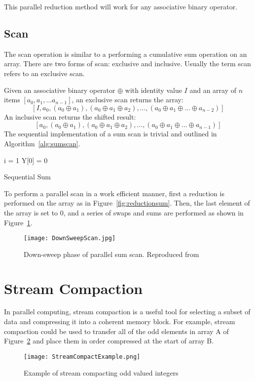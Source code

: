 This parallel reduction method will work for any associative binary operator.

\subsection{Scan}
The scan operation is similar to a performing a cumulative sum operation on an array. There are two forms of scan: exclusive and inclusive. Usually the term scan refers to an exclusive scan.\par
Given an associative binary operator $\oplus$ with identity value $I$ and an array of $n$ items $[a_0, a_1, \ldots a_{n-1}]$, an exclusive scan returns the array: $$[I, a_0, (a_0 \oplus a_1), (a_0 \oplus a_1 \oplus a_2),\ldots, (a_0 \oplus a_1 \oplus \ldots \oplus a_{n-2})]$$ An inclusive scan returns the shifted result:  $$[a_0, (a_0 \oplus a_1), (a_0 \oplus a_1 \oplus a_2),\ldots, (a_0 \oplus a_1 \oplus \ldots \oplus a_{n-1})]$$ The sequential implementation of a sum scan is trivial and outlined in Algorithm~\ref{alg:sumscan}.

\begin{algorithm}[!htpb]
\label{alg:sumscan}
 \singlespacing
 i = 1\;
 Y[0] = 0\;
 \caption{Sequential Sum}
\end{algorithm}
To perform a parallel scan in a work efficient manner, first a reduction is performed on the array as in Figure~\ref{fig:reductionsum}. Then, the last element of the array is set to 0, and a series of swaps and sums are performed as shown in Figure~\ref{fig:downsweepscan}.
\begin{figure}[h]
    \centering
    \texttt{[image: DownSweepScan.jpg]}
    \caption{Down-sweep phase of parallel sum scan. Reproduced from\cite{nguyen2007gpu}}
    \label{fig:downsweepscan}
\end{figure}
\section{Stream Compaction}
In parallel computing, stream compaction is a useful tool for selecting a subset of data and compressing it into a coherent memory block. For example, stream compaction could be used to transfer all of the odd elements in array A of Figure~\ref{fig:streamcompactexample} and place them in order compressed at the start of array B.

\begin{figure}[!htpb]
    \centering
    \texttt{[image: StreamCompactExample.png]}
    \caption{Example of stream compacting odd valued integers}
    \label{fig:streamcompactexample}
\end{figure}

